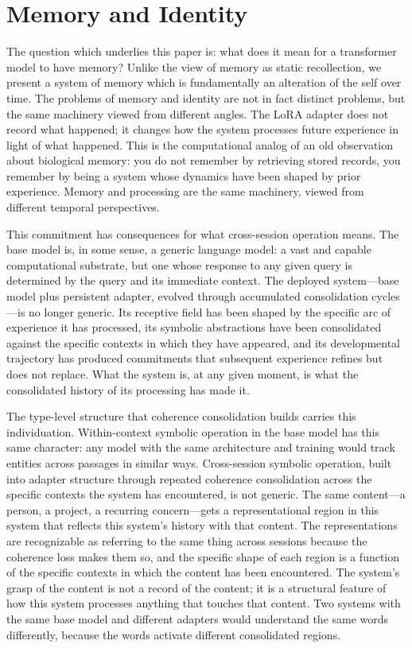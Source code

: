 \documentclass[11pt]{article}
\begin{document}
\section{Memory and Identity}

The question which underlies this paper is: what does it mean for a transformer model to have memory? Unlike the view of memory as static recollection, we present a system of memory which is fundamentally an alteration of the self over time. The problems of memory and identity are not in fact distinct problems, but the same machinery viewed from different angles. The LoRA adapter does not record what happened; it changes how the system processes future experience in light of what happened. This is the computational analog of an old observation about biological memory: you do not remember by retrieving stored records, you remember by being a system whose dynamics have been shaped by prior experience. Memory and processing are the same machinery, viewed from different temporal perspectives.

This commitment has consequences for what cross-session operation means. The base model is, in some sense, a generic language model: a vast and capable computational substrate, but one whose response to any given query is determined by the query and its immediate context. The deployed system---base model plus persistent adapter, evolved through accumulated consolidation cycles---is no longer generic. Its receptive field has been shaped by the specific arc of experience it has processed, its symbolic abstractions have been consolidated against the specific contexts in which they have appeared, and its developmental trajectory has produced commitments that subsequent experience refines but does not replace. What the system is, at any given moment, is what the consolidated history of its processing has made it.

The type-level structure that coherence consolidation builds carries this individuation. Within-context symbolic operation in the base model has this same character: any model with the same architecture and training would track entities across passages in similar ways. Cross-session symbolic operation, built into adapter structure through repeated coherence consolidation across the specific contexts the system has encountered, is not generic. The same content---a person, a project, a recurring concern---gets a representational region in this system that reflects this system's history with that content. The representations are recognizable as referring to the same thing across sessions because the coherence loss makes them so, and the specific shape of each region is a function of the specific contexts in which the content has been encountered. The system's grasp of the content is not a record of the content; it is a structural feature of how this system processes anything that touches that content. Two systems with the same base model and different adapters would understand the same words differently, because the words activate different consolidated regions.
\end{document}
